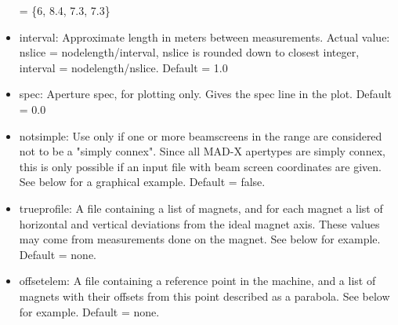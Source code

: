 \begin{itemize}
     = \{6, 8.4, 7.3, 7.3\}  
   \item interval: Approximate length in meters between
     measurements. Actual value:  nslice = nodelength/interval, nslice
     is rounded down to closest integer,  interval =
     nodelength/nslice. Default = 1.0  
   \item spec: Aperture spec, for plotting only. Gives the spec line in
     the plot. Default = 0.0  
   \item notsimple: Use only if one or more beamscreens in the range are
     considered not to  be a "simply connex". Since all MAD-X apertypes
     are simply connex, this is only possible  if an input file with
     beam screen coordinates are given. See below for a graphical
     example. Default = false.  
   \item trueprofile: A file containing a list of magnets, and for each
     magnet a list of horizontal and vertical deviations from the ideal
     magnet axis. These values may come from measurements done on the
     magnet. See below for example. Default = none.  
   \item offsetelem: A file containing a reference point in the machine,
     and a list of magnets with their offsets from this point described
     as a parabola. See below for example. Default = none.  
\end{itemize}


